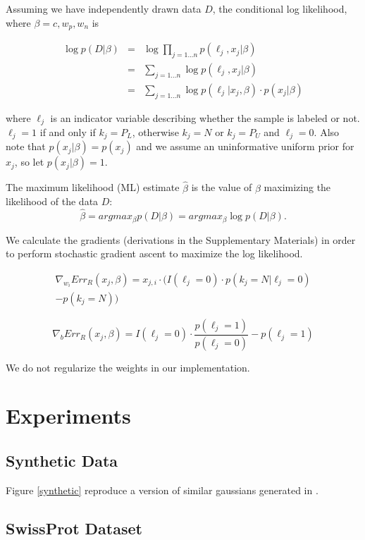 \documentclass{article}
\begin{document}
Assuming we have independently drawn data $D$, the conditional log likelihood, where $\beta = c, w_p, w_n$ is

\begin{eqnarray*}
\log{p(D | \beta)} &=& \log \prod_{j=1...n}{p(\ell_j, x_j | \beta)} \\
 &=& \sum_{j=1...n}{\log{p(\ell_j, x_j | \beta)}} \\
 &=& \sum_{j=1...n}{\log{p(\ell_j | x_j, \beta)}} \cdot p(x_j | \beta)
\end{eqnarray*}

where $\ell_j$ is an indicator variable describing whether the sample is labeled or not. $\ell_j = 1$ if and only if $k_j=P_L$, otherwise $k_j = N$ or $k_j=P_U$ and $\ell_j = 0$.  Also note that $p(x_j|\beta) = p(x_j)$ and we assume an uninformative uniform prior for $x_j$, so let $p(x_j|\beta) = 1$.

The maximum likelihood (ML) estimate $\hat \beta$ is the value of $\beta$ maximizing the likelihood of the data $D$:
$$
\hat \beta = arg max_{\beta} p(D | \beta) = arg max_{\beta} \log{p(D | \beta)}.
$$

We calculate the gradients (derivations in the Supplementary Materials) in order to perform stochastic gradient ascent to maximize the log likelihood.

\begin{eqnarray*}
\nabla_{w_i}{Err_R (x_j, \beta)} = x_{j,i} \cdot
    \big(	I(\ell_j=0) \cdot p(k_j=N | \ell_j=0) \\
		- p(k_j=N)
    \big)
\end{eqnarray*}

$$
\nabla_{b}{Err_R (x_j, \beta)}  = I(\ell_j=0) \cdot
		\frac{p(\ell_j=1)}{p(\ell_j=0)}
		-
		 p(\ell_j=1)
$$

We do not regularize the weights in our implementation.

\section{Experiments}

\subsection{Synthetic Data}

Figure \ref{synthetic} reproduce a version of similar gaussians generated in \cite{elkan08}. 

\subsection{SwissProt Dataset}
\end{document}
